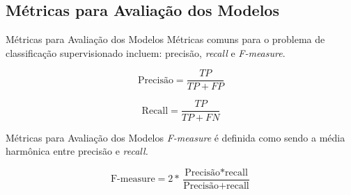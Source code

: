 \subsection{Métricas para Avaliação dos Modelos}
\begin{frame}{Métricas para Avaliação dos Modelos}
    Métricas comuns para o problema de classificação supervisionado incluem:
    precisão, \textit{recall} e \textit{F-measure}.


    \begin{equation}
        \text{Precisão} = \frac{TP}{TP + FP} 
    \end{equation}

    \vspace{0.2cm}

    \begin{equation}
        \text{Recall} = \frac{TP}{TP + FN}
    \end{equation}

    \vspace{0.2cm}

\end{frame}

\begin{frame}{Métricas para Avaliação dos Modelos}
    \textit{F-measure} é definida como sendo a média harmônica entre precisão e
    \textit{recall.} 

    \vspace{0.2cm}

    \begin{equation}
        \text{F-measure} = 2 * \frac{\text{Precisão} * \text{recall}}
                                    {\text{Precisão} + \text{recall}}
    \end{equation}
    
\end{frame}

